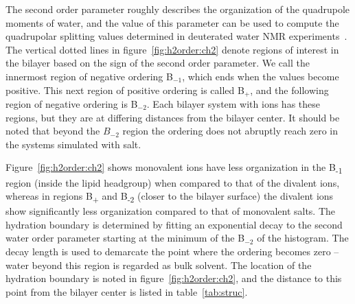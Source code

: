 \documentclass[12pt,openany,final]{book}
\begin{document}
The second order parameter
roughly describes the organization of the quadrupole moments of water, {and the value of this parameter
can be used to compute the} quadrupolar splitting values determined in 
deuterated water NMR experiments~\cite{aaman:2003,kruczek:2017:ether}.
The vertical dotted lines in figure~\ref{fig:h2order:ch2} denote regions of interest in the bilayer 
based on the {sign} of the second order parameter. We call the innermost region of negative ordering
B$_{-1}$, which ends when the values become positive. This next region of positive ordering is
called B$_{+}$, and the following region of negative ordering is B$_{-2}$. Each bilayer system with ions
has these regions, but they are at differing distances from the bilayer center.
It should be noted that beyond the $B_{-2}$ region the ordering does not abruptly reach zero in the systems
simulated with salt.

{
    Figure~\ref{fig:h2order:ch2} shows monovalent ions have 
    less organization in the B\textsubscript{-1} region (inside the lipid headgroup) when compared to that of the divalent ions,  
    whereas in regions B\textsubscript{+} and B\textsubscript{-2} (closer to the bilayer surface) the divalent ions show significantly
    less organization compared to that of monovalent salts.} 
The hydration boundary is determined by  
fitting an exponential decay to the second water order parameter starting
at the minimum of the B$_{-2}$ of the histogram.
The decay length is used to demarcate the point where the ordering becomes zero -- water beyond this region is
regarded as bulk solvent. The location of the hydration boundary 
is noted in figure~\ref{fig:h2order:ch2}, and the distance 
to this point from the bilayer center is listed in table~\ref{tab:struc}.
\end{document}
